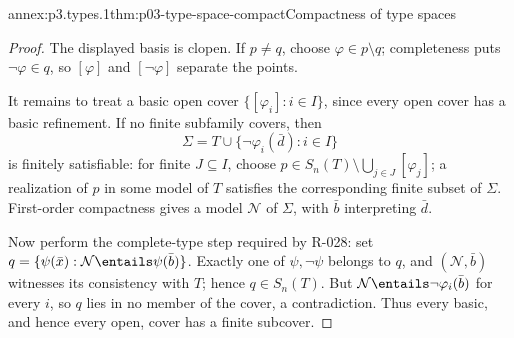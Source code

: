 
\begin{annexitem}{annex:p3.types.1}{thm:p03-type-space-compact}{Compactness of type spaces}
\begin{proof}
The displayed basis is clopen.  If \(p\ne q\), choose
\(\varphi\in p\setminus q\); completeness puts \(\neg\varphi\in q\), so
\([\varphi]\) and \([\neg\varphi]\) separate the points.

It remains to treat a basic open cover \(\{[\varphi_i]:i\in I\}\), since
every open cover has a basic refinement.  If no finite subfamily covers, then
\[
 \Sigma=T\cup\{\neg\varphi_i(\bar d):i\in I\}
\]
is finitely satisfiable: for finite \(J\subseteq I\), choose
\(p\in S_n(T)\setminus\bigcup_{j\in J}[\varphi_j]\); a realization of
\(p\) in some model of \(T\) satisfies the corresponding finite subset of
\(\Sigma\).  First-order compactness gives a model \(\mathcal N\) of
\(\Sigma\), with \(\bar b\) interpreting \(\bar d\).

Now perform the complete-type step required by R-028: set
\(q=\{\psi(\bar x):\mathcal N\entails\psi(\bar b)\}\).  Exactly one of
\(\psi,\neg\psi\) belongs to \(q\), and \((\mathcal N,\bar b)\) witnesses
its consistency with \(T\); hence \(q\in S_n(T)\).  But
\(\mathcal N\entails\neg\varphi_i(\bar b)\) for every \(i\), so \(q\) lies
in no member of the cover, a contradiction.  Thus every basic, and hence
every open, cover has a finite subcover.
\end{proof}
\end{annexitem}

